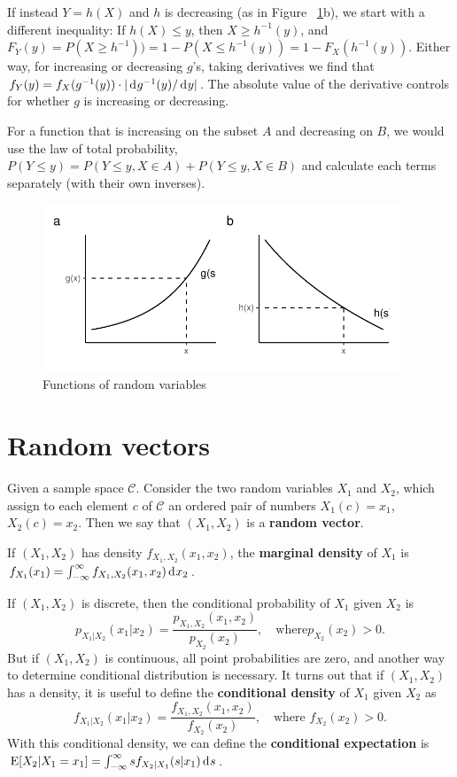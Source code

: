 \documentclass[twoside]{article}
\begin{document}
If instead $Y=h(X)$ and $h$ is decreasing (as in Figure ~\ref{fig:frv}b), we
start with a different inequality: If $h(X) \leq y$, then $X\geq h^{-1}(y)$,
and $F_Y(y) = P(X\geq h^{-1})) = 1 - P(X\leq h^{-1}(y)) = 1 - F_X(h^{-1}(y))$.
Either way, for increasing or decreasing $g$'s, taking derivatives we find that 
$f_Y(y) = f_X(g^{-1}(y)) \cdot | \rd g^{-1}(y)/\rd y|$.
The absolute value of the derivative controls for whether $g$ is increasing or decreasing.

For a function that is increasing on the subset $A$ and decreasing on $B$, we would use the
law of total probability, $P(Y\leq y)= P(Y\leq y , X\in A) + P(Y\leq y , X\in B)$ and 
calculate each terms separately (with their own inverses). 

\begin{figure}[tb]
\includegraphics[width=0.95\textwidth]{../graphs/transformation_of_RV}

\caption{Functions of random variables}\label{fig:frv}
\end{figure}



\section{Random vectors}
Given a sample space $\mathcal{C}$. Consider the
two random variables $X_1$ and $X_2$, which assign to each element
$c$ of $\mathcal{C}$ an ordered pair of numbers
$X_1(c)=x_1$, $X_2(c)=x_2$. Then we say that $(X_1,X_2)$ is a
\textbf{random vector}. 

If $(X_1,X_2)$ has density $f_{X_1,X_2}(x_1,x_2)$, the \textbf{marginal density}
of $X_1$ is  $ f_{X_1}(x_1) = \int_{-\infty}^\infty f_{X_1,X_2}(x_1,x_2)\rd x_2$.

If $(X_1,X_2)$ is discrete, then the conditional probability of $X_1$ given $X_2$ is
\[ p_{X_1|X_2}(x_1|x_2) = \frac{p_{X_1,X_2}(x_1,x_2)}{p_{X_2}(x_2)}, \quad \text{where
$p_{X_2}(x_2)>0$}.\] But if $(X_1,X_2)$ is continuous, all point probabilities are
zero, and another way to determine conditional distribution is necessary. It
turns out that if $(X_1,X_2)$ has a density, it is useful to define the
\textbf{conditional density} of $X_1$ given $X_2$ as
\[f_{X_1|X_2}(x_1|x_2)=\frac{f_{X_1,X_2}(x_1,x_2)}{f_{X_2}(x_2)},\quad \text{where $f_{X_2}(x_2)>0$}.\]
With this conditional density, we can define
the \textbf{conditional expectation} is $\E[X_2|X_1=x_1] = \int_{-\infty}^\infty s
f_{X_2|X_1}(s|x_1) \rd s$.
\end{document}
